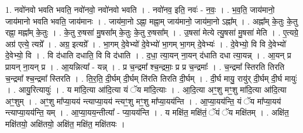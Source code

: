 \documentclass[17pt]{extarticle}
\begin{document}
1. नवो॑नवो भवति भवति॒ नवो॑नवो॒ नवो॑नवो भवति । . नवो॑नव॒ इति॒ नवः॑ - न॒वः॒ । . भ॒व॒ति॒ जाय॑मानो॒ जाय॑मानो भवति भवति॒ जाय॑मानः । . जाय॑मा॒नो ऽह्ना॒ मह्ना॒म् जाय॑मानो॒ जाय॑मा॒नो ऽह्ना᳚म् । . अह्ना᳚म् के॒तुः के॒तु रह्ना॒ मह्ना᳚म् के॒तुः । . के॒तु रु॒षसा॑ मु॒षसा᳚म् के॒तुः के॒तु रु॒षसा᳚म् । . उ॒षसा॑ मेत्ये त्यु॒षसा॑ मु॒षसा॑ मेति । . ए॒त्यग्रे॒ अग्र॑ एत्ये॒ त्यग्रे᳚ । . अग्र॒ इत्यग्रे᳚ । . भा॒गम् दे॒वेभ्यो॑ दे॒वेभ्यो॑ भा॒गम् भा॒गम् दे॒वेभ्यः॑ । . दे॒वेभ्यो॒ वि वि दे॒वेभ्यो॑ दे॒वेभ्यो॒ वि । . वि द॑धाति दधाति॒ वि वि द॑धाति । . द॒धा॒ त्या॒यन् ना॒यन् द॑धाति दधा त्या॒यन्न् । . आ॒यन् प्र प्रायन् ना॒यन् प्र । . आ॒यन्नित्या᳚ - यन्न् । . प्र च॒न्द्रमा᳚ श्च॒न्द्रमाः॒ प्र प्र च॒न्द्रमाः᳚ । . च॒न्द्रमा᳚ स्तिरति तिरति च॒न्द्रमा᳚ श्च॒न्द्रमा᳚ स्तिरति । . ति॒र॒ति॒ दी॒र्घम् दी॒र्घम् ति॑रति तिरति दी॒र्घम् । . दी॒र्घ मायु॒ रायु॑र् दी॒र्घम् दी॒र्घ मायुः॑ । . आयु॒रित्यायुः॑ । . य मा॑दि॒त्या आ॑दि॒त्या यं ॅय मा॑दि॒त्याः । . आ॒दि॒त्या अꣳ॒॒शु मꣳ॒॒शु मा॑दि॒त्या आ॑दि॒त्या अꣳ॒॒शुम् । . अꣳ॒॒शु मा᳚प्या॒यय॑ न्त्याप्या॒यय॑ न्त्यꣳ॒॒शु मꣳ॒॒शु मा᳚प्या॒यय॑न्ति । . आ॒प्या॒यय॑न्ति॒ यं ॅय मा᳚प्या॒यय॑ न्त्याप्या॒यय॑न्ति॒ यम् । . आ॒प्या॒यय॒न्तीत्या᳚ - प्या॒यय॑न्ति । . य मक्षि॑त॒ मक्षि॑तं॒ ॅयं ॅय मक्षि॑तम् । . अक्षि॑त॒ मक्षि॑तयो॒ अक्षि॑तयो॒ अक्षि॑त॒ मक्षि॑त॒ मक्षि॑तयः । \newline
\end{document}
